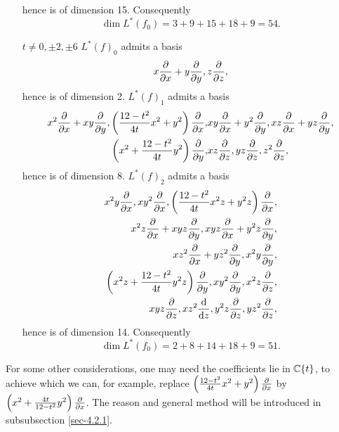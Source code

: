 \begin{itemize}
      hence is of dimension 15. Consequently
      \[\dim L^*(f_0) = 3+9+15+18+9=54.\]
    \item[$t\not=0,\pm2,\pm6$]
      $L^*(f)_0$ admits a basis 
      \[ x\pd{}x+y\pd{}y, z\pd{}z,\]
      hence is of dimension 2.
      $L^*(f)_1$ admits a basis 
      \begin{align*}
        x^2\pd{}x+xy\pd{}y,
        \left(\frac{12-t^2}{4t}x^2+y^2\right)\pd{}x ,&
        xy\pd{}x+y^2\pd{}y,
        xz\pd{}x+yz\pd{}y,\\
        \left( x^2+\frac{12-t^2}{4t}y^2\right)\pd{}y, &
        xz\pd{}z,
        yz\pd{}z,
        z^2\pd{}z,
      \end{align*}
      hence is of dimension 8.
      $L^*(f)_2$ admits a basis 
      \begin{align*}
        x^2y\pd{}x,
        xy^2\pd{}x,
        \left(\frac{12-t^2}{4t}x^2z+y^2z\right)\pd{}x,\\
        x^2z\pd{}x+xyz\pd{}y,
        xyz\pd{}x+y^2z\pd{}y,\\
        xz^2\pd{}x+yz^2\pd{}y,
        x^2y\pd{}y,\\
        \left(x^2z+\frac{12-t^2}{4t}y^2z\right)\pd{}y,
        xy^2\pd{}y,
        x^2z\pd{}z,\\
        xyz\pd{}z,
        xz^2\od{}z,
        y^2z\pd{}z,
        yz^2\pd{}z,
      \end{align*}
      hence is of dimension 14. Consequently
      \[\dim L^*(f_0) = 2+8+14+18+9=51.\]
  \end{itemize}

  For some other considerations, one may need the coefficients lie in $\Cc\{t\}$, to achieve which we can, for example, replace $ \left(\frac{12-t^2}{4t}x^2+y^2\right)\pd{}x$ by $ \left(x^2+\frac{4t}{12-t^2}y^2\right)\pd{}x$. The reason and general method will be introduced in subsubsection \ref{sec-4.2.1}.

